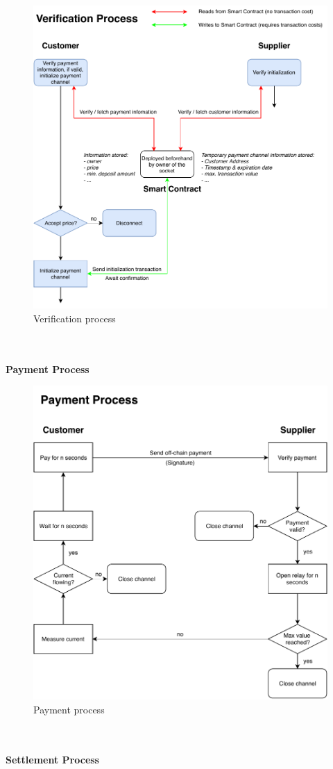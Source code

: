 \begin{figure}[h]
    \includegraphics[width=\textwidth]{img/Plug-Socket-verification_process.pdf}
    \caption{Verification process}
    \label{fig:verification_process}
\end{figure}
\\\\
\textbf{Payment Process}\\
\begin{figure}[h]
    \includegraphics[width=\textwidth]{img/Plug-Socket-payment_process.pdf}
    \caption{Payment process}
    \label{fig:payment_process}
\end{figure}
\\\\
\textbf{Settlement Process}\\


